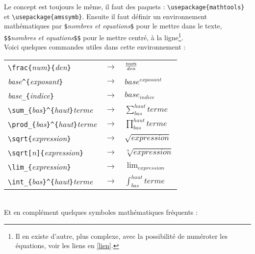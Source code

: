 \documentclass[11pt]{article}				%
\begin{document}
\noindent Le concept est toujours le même, il faut des paquets : \verb?\usepackage{mathtools}? et \verb?\usepackage{amssymb}?. Ensuite il faut définir un environnement mathématiques par \verb?$?\emph{nombres et equations}\verb?$? pour le mettre dans le texte, \verb?$$?\emph{nombres et equations}\verb?$$? pour le mettre centré, à la ligne\footnote{Il en existe d'autre, plus complexe, avec la possibilité de numéroter les équations, voir les liens en \ref{lien}.}. \\


\noindent Voici quelques commandes utiles dans cette environnement : \\

\begin{tabular}{lcl}

\verb?\frac{?\emph{num}\verb?}{?\emph{den}\verb?}? & $\rightarrow$ & $\frac{\emph{num}}{\emph{den}}$ \\
\emph{base}\verb?^{?\emph{exposant}\verb?}? & $\rightarrow$ & $base^{exposant}$ \\
\emph{base}\verb?_{?\emph{indice}\verb?}? & $\rightarrow$ & $base_{indice}$ \\
\verb?\sum_{?\emph{bas}\verb?}^{?\emph{haut}\verb?}?\emph{terme} & $\rightarrow$ & $\sum_{bas}^{haut} terme$ \\ 
\verb?\prod_{?\emph{bas}\verb?}^{?\emph{haut}\verb?}?\emph{terme} & $\rightarrow$ & $\prod_{bas}^{haut} terme$ \\
\verb?\sqrt{?\emph{expression}\verb?}? & $\rightarrow$ & $\sqrt{expression}$ \\
\verb?\sqrt[?\emph{n}\verb?]{?\emph{expression}\verb?}? & $\rightarrow$ & $\sqrt[n]{expression}$ \\
\verb?\lim_{?\emph{expression}\verb?}? & $\rightarrow$ & $\lim_{expression}$ \\
\verb?\int_{?\emph{bas}\verb?}^{?\emph{haut}\verb?}?\emph{terme} & $\rightarrow$ & $\int_{bas}^{haut} terme$ \\

\end{tabular}\\


\noindent Et en complément quelques symboles mathématiques fréquents : \\
\end{document}
